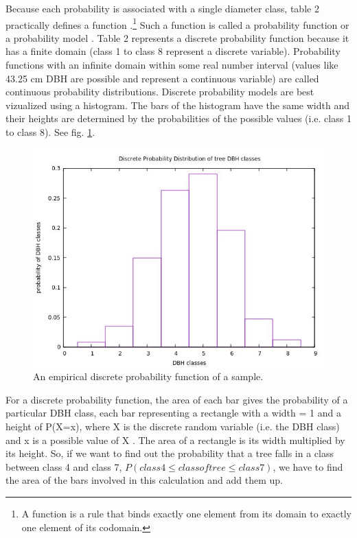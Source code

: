 \documentclass {article}
\begin{document}
Because each probability is associated with a single diameter class, table 2 practically defines a function \cite{lial_calculus_2012}.\footnote{A function is a rule that binds exactly one element from its domain to exactly one element of its codomain\cite{takahashi_manga_2012}.}
 Such a function is called a probability function \cite{lial_calculus_2012} or a probability model \cite{pfeffer_practical_2016}. 
Table 2 represents a discrete probability function because it has a finite domain (class 1 to class 8 represent a discrete variable).
 Probability functions with an infinite domain within some real number interval (values like 43.25 cm DBH are possible and represent a continuous variable) are called continuous probability distributions.  
Discrete probability models are best vizualized using a histogram. The bars of the histogram have the same width and their heights are determined by the probabilities of the possible values (i.e. class 1 to class 8). See fig. \ref{fig: discrete prob}.
\begin{figure} [H]
\includegraphics[width=\linewidth] {fig2.jpg}
\caption{An empirical discrete probability function of a sample.}
\label{fig: discrete prob}
\end{figure}
For a discrete probability function, the area of each bar gives the probability of a particular DBH class, each bar representing a rectangle with a width = 1 and a height of P(X=x), where X is the discrete random variable (i.e. the DBH class) and x is a possible value of X \cite{lial_calculus_2012}.
 The area of a rectangle is its width multiplied by its height. So, if we want to find out the probability that a tree falls in a class between class 4 and class 7, $P(class 4 \leq class of tree \leq class 7)$, we have to find the area of the bars involved in this calculation and add them up.
\end{document}
